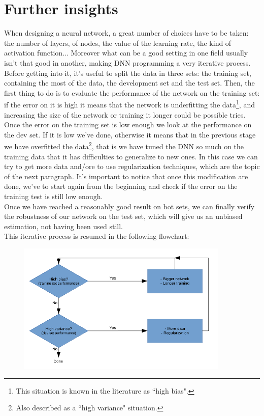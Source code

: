\documentclass[12pt, a4paper]{report}
\theoremstyle{definition}
\begin{document}
{\section{Further insights}\label{section1.2}
When designing a neural network, a great number of choices have to be taken: the number of layers, of nodes, the value of the learning rate, the kind of activation function... Moreover what can be a good setting in one field usually isn't that good in another, making DNN programming a very iterative process. \\
Before getting into it, it's useful to split the data in three sets: the training set, containing the most of the data, the development set and the test set. Then, the first thing to do is to evaluate the performance of the network on the training set: if the error on it is high it means that the network is underfitting the data\footnote{This situation is known in the literature as ``high bias".}, and increasing the size of the network or training it longer could be possible tries. Once the error on the training set is low enough we look at the performance on the dev set. If it is low we've done, otherwise it means that in the previous stage we have overfitted the data\footnote{Also described as a ``high variance" situation.}, that is we have tuned the DNN so much on the training data that it has difficulties to generalize to new ones. In this case we can try to get more data and/ore to use regularization techniques, which are the topic of the next paragraph. It's important to notice that once this modification are done, we've to start again from the beginning and check if the error on the training test is still low enough.\\
Once we have reached a reasonably good result on bot sets, we can finally verify the robustness of our network on the test set, which will give us an unbiased estimation, not having been used still.\\
This iterative process is resumed in the following flowchart:
\begin{figure}[H]
	\centering
	\includegraphics[width=0.9\textwidth]{img/flowchart}

\end{figure}}
\end{document}
